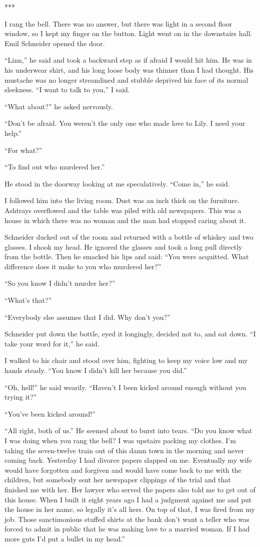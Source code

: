 {***

I rang the bell. There was no answer, but there was light in a second floor window, so I kept my finger on the button. Light went on in the downstairs hall. Emil Schneider opened the door.

“Linn,” he said and took a backward step as if afraid I would hit him. He was in his underwear shirt, and his long loose body was thinner than I had thought. His mustache was no longer streamlined and stubble deprived his face of its normal sleekness. “I want to talk to you,” I said.

“What about?” he asked nervously.

“Don’t be afraid. You weren’t the only one who made love to Lily. I need your help.”

“For what?”

“To find out who murdered her.”

He stood in the doorway looking at me speculatively. “Come in,” he said.

I followed him into the living room. Dust was an inch thick on the furniture. Ashtrays overflowed and the table was piled with old newspapers. This was a house in which there was no woman and the man had stopped caring about it.

Schneider ducked out of the room and returned with a bottle of whiskey and two glasses. I shook my head. He ignored the glasses and took a long pull directly from the bottle. Then he smacked his lips and said: “You were acquitted. What difference does it make to you who murdered her?”

“So you know I didn’t murder her?”

“What’s that?”

“Everybody else assumes that I did. Why don’t you?”

Schneider put down the bottle, eyed it longingly, decided not to, and sat down. “I take your word for it,” he said.

I walked to his chair and stood over him, fighting to keep my voice low and my hands steady. “You know I didn’t kill her because you did.”

“Oh, hell!” he said wearily. “Haven’t I been kicked around enough without you trying it?”

“You’ve been kicked around!”

“All right, both of us.” He seemed about to burst into tears. “Do you know what I was doing when you rang the bell? I was upstairs packing my clothes. I’m taking the seven-twelve train out of this damn town in the morning and never coming back. Yesterday I had divorce papers slapped on me. Eventually my wife would have forgotten and forgiven and would have come back to me with the children, but somebody sent her newspaper clippings of the trial and that finished me with her. Her lawyer who served the papers also told me to get out of this house. When I built it eight years ago I had a judgment against me and put the house in her name, so legally it’s all hers. On top of that, I was fired from my job. Those sanctimonious stuffed shirts at the bank don’t want a teller who was forced to admit in public that he was making love to a married woman. If I had more guts I’d put a bullet in my head.”

}
